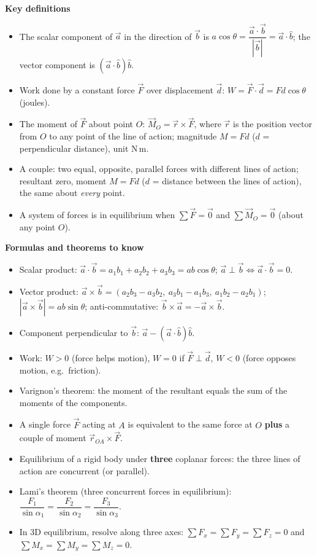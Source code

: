 \documentclass[11pt]{article}
\newcommand{\cle}[1]{{\popxbold\color{popdark}#1}}
\begin{document}
\begin{bilan}
\textbf{Key definitions}
\begin{itemize}
\item The \cle{scalar component} of $\vec{a}$ in the direction of $\vec{b}$ is $a\cos\theta=\dfrac{\vec{a}\cdot\vec{b}}{|\vec{b}|}=\vec{a}\cdot\hat{b}$; the \cle{vector component} is $\left(\vec{a}\cdot\hat{b}\right)\hat{b}$.
\item \cle{Work} done by a constant force $\vec{F}$ over displacement $\vec{d}$: $W=\vec{F}\cdot\vec{d}=Fd\cos\theta$ (joules).
\item The \cle{moment} of $\vec{F}$ about point $O$: $\vec{M}_O=\vec{r}\times\vec{F}$, where $\vec{r}$ is the position vector from $O$ to any point of the line of action; magnitude $M=Fd$ ($d$ = perpendicular distance), unit $\mathrm{N\,m}$.
\item A \cle{couple}: two equal, opposite, parallel forces with different lines of action; resultant zero, moment $M=Fd$ ($d$ = distance between the lines of action), the same about \emph{every} point.
\item A system of forces is in \cle{equilibrium} when $\sum\vec{F}=\vec{0}$ and $\sum\vec{M}_O=\vec{0}$ (about any point $O$).
\end{itemize}

\textbf{Formulas and theorems to know}
\begin{itemize}
\item Scalar product: $\vec{a}\cdot\vec{b}=a_1b_1+a_2b_2+a_3b_3=ab\cos\theta$; $\vec{a}\perp\vec{b}\iff\vec{a}\cdot\vec{b}=0$.
\item Vector product: $\vec{a}\times\vec{b}=(a_2b_3-a_3b_2,\ a_3b_1-a_1b_3,\ a_1b_2-a_2b_1)$; $|\vec{a}\times\vec{b}|=ab\sin\theta$; anti-commutative: $\vec{b}\times\vec{a}=-\vec{a}\times\vec{b}$.
\item Component perpendicular to $\vec{b}$: $\vec{a}-(\vec{a}\cdot\hat{b})\hat{b}$.
\item Work: $W>0$ (force helps motion), $W=0$ if $\vec{F}\perp\vec{d}$, $W<0$ (force opposes motion, e.g.\ friction).
\item Varignon's theorem: the moment of the resultant equals the sum of the moments of the components.
\item A single force $\vec{F}$ acting at $A$ is equivalent to the same force at $O$ \textbf{plus} a couple of moment $\vec{r}_{OA}\times\vec{F}$.
\item Equilibrium of a rigid body under \textbf{three} coplanar forces: the three lines of action are concurrent (or parallel).
\item Lami's theorem (three concurrent forces in equilibrium): $\dfrac{F_1}{\sin\alpha_1}=\dfrac{F_2}{\sin\alpha_2}=\dfrac{F_3}{\sin\alpha_3}$.
\item In 3D equilibrium, resolve along three axes: $\sum F_x=\sum F_y=\sum F_z=0$ and $\sum M_x=\sum M_y=\sum M_z=0$.
\end{itemize}


\end{bilan}
\end{document}
